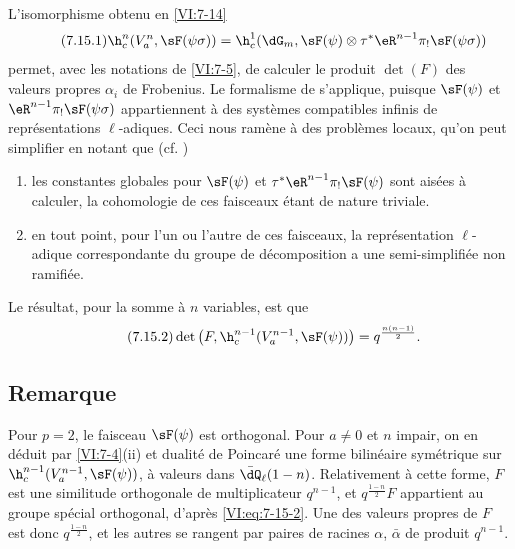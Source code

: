 L'isomorphisme obtenu en \ref{VI:7-14} 
\begin{equation*}\tag{7.15.1}\label{VI:eq:7-15-1}
  \h_c^n(V_a^n,\sF(\psi\sigma)) = \h_c^1(\dG_m,\sF(\psi)\otimes \tau^\ast \eR^{n-1} \pi_! \sF(\psi\sigma)) 
\end{equation*}
permet, avec les notations de \ref{VI:7-5}, de calculer le produit $\det(F)$ 
des valeurs propres $\alpha_i$ de Frobenius. Le formalisme de \cite{de73} 
s'applique, puisque $\sF(\psi)$ et $\eR^{n-1} \pi_! \sF(\psi\sigma)$ 
appartiennent à des systèmes compatibles infinis de représentations 
$\ell$-adiques. Ceci nous ramène à des problèmes locaux, qu'on peut 
simplifier en notant que (cf. \cite[9.5]{de73}) 
\begin{enumerate}[\indent a)]
  \item les constantes globales pour 
    $\sF(\psi)$ et $\tau^\ast \eR^{n-1} \pi_! \sF(\psi)$ sont aisées à 
    calculer, la cohomologie de ces faisceaux étant de nature triviale. 
  \item en tout point, pour l'un ou l'autre de ces faisceaux, la 
    représentation $\ell$-adique correspondante du groupe de décomposition 
    a une semi-simplifiée non ramifiée. 
\end{enumerate}

Le résultat, pour la somme à $n$ variables, est que 
\begin{equation*}\tag{7.15.2}\label{VI:eq:7-15-2}
  \det\left(F,\h_c^{n-1}(V_a^{n-1},\sF(\psi))\right) = q^{\frac{n(n-1)}{2}} \text{.} 
\end{equation*}





\subsection{Remarque}\label{VI:7-16}

Pour $p=2$, le faisceau $\sF(\psi)$ est orthogonal. Pour $a\ne 0$ et $n$ 
impair, on en déduit par \ref{VI:7-4}(ii) et dualité de Poincaré une 
forme bilinéaire symétrique sur $\h_c^{n-1}(V_a^{n-1},\sF(\psi))$, à 
valeurs dans $\bar\dQ_\ell(1-n)$. Relativement à cette forme, $F$ est une 
similitude orthogonale de multiplicateur $q^{n-1}$, et $q^{\frac{1-n}{2}} F$ 
appartient au groupe spécial orthogonal, d'après \eqref{VI:eq:7-15-2}. Une 
des valeurs propres de $F$ est donc $q^{\frac{1-n}{2}}$, et les autres se 
rangent par paires de racines $\alpha$, $\bar\alpha$ de produit $q^{n-1}$. 

